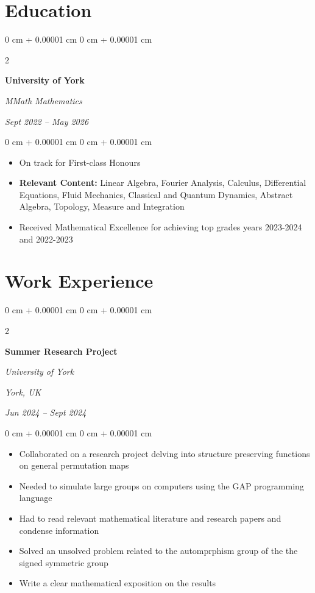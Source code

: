 \documentclass[10pt, letterpaper]{article}
\newenvironment{highlights}{
    \begin{itemize}[
        topsep=0.10 cm,
        parsep=0.10 cm,
        partopsep=0pt,
        itemsep=0pt,
        leftmargin=0 cm + 10pt
    ]
}{
    \end{itemize}
} %
\newenvironment{onecolentry}{
    \begin{adjustwidth}{
        0 cm + 0.00001 cm
    }{
        0 cm + 0.00001 cm
    }
}{
    \end{adjustwidth}
} %
\newenvironment{twocolentry}[2][]{
    \onecolentry
    \def\secondColumn{#2}
    \setcolumnwidth{\fill, 4.5 cm}
    \begin{paracol}{2}
}{
    \switchcolumn \raggedleft \secondColumn
    \end{paracol}
    \endonecolentry
} %
\begin{document}
    
    \section{Education}

    
        \begin{twocolentry}{
            
            
        \textit{Sept 2022 – May 2026}}
            \textbf{University of York}

            \textit{MMath Mathematics}
        \end{twocolentry}

        \vspace{0.10 cm}
        \begin{onecolentry}
            \begin{highlights}
                \item On track for First-class Honours
                \item \textbf{Relevant Content:} Linear Algebra, Fourier Analysis, Calculus, Differential Equations, Fluid Mechanics, Classical and Quantum Dynamics, Abstract Algebra, Topology, Measure and Integration
                \item Received Mathematical Excellence for achieving top grades years 2023-2024 and 2022-2023
            \end{highlights}
        \end{onecolentry}

    \section{Work Experience}

        
        \begin{twocolentry}{
        \textit{York, UK}    
            
        \textit{Jun 2024 – Sept 2024}}
            \textbf{Summer Research Project}
            
            \textit{University of York}
        \end{twocolentry}

        \vspace{0.10 cm}
        \begin{onecolentry}
            \begin{itemize}
        
               \item Collaborated on a research project delving into structure preserving functions on general permutation maps
               \item Needed to simulate large groups on computers using the GAP programming language
               \item Had to read relevant mathematical literature and research papers and condense information
               \item Solved an unsolved problem related to the automprphism group of the the signed symmetric group
               \item Write a clear mathematical exposition on the results
            \end{itemize}
        \end{onecolentry}
\end{document}
